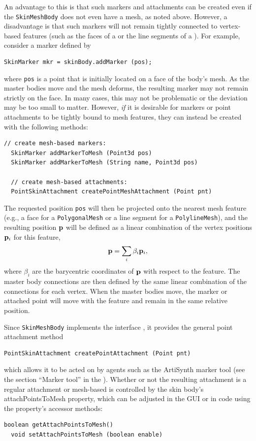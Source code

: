 An advantage to this is that such markers and attachments can be
created even if the {\tt SkinMeshBody} does not even have a mesh, as
noted above. However, a disadvantage is that such markers will not
remain tightly connected to vertex-based features (such as the faces
of a  or the line segments
of a ). For example,
consider a marker defined by
%
\begin{lstlisting}[]
  SkinMarker mkr = skinBody.addMarker (pos);
\end{lstlisting}
%
where {\tt pos} is a point that is initially located on a face of the
body's mesh. As the master bodies move and the mesh deforms, the
resulting marker may not remain strictly on the face. In many cases,
this may not be problematic or the deviation may be too small to
matter. However, {\it if} it is desirable for markers or point
attachments to be tightly bound to mesh features, they can instead be
created with the following methods:
%
\begin{lstlisting}[]
  // create mesh-based markers:
  SkinMarker addMarkerToMesh (Point3d pos)
  SkinMarker addMarkerToMesh (String name, Point3d pos)

  // create mesh-based attachments:
  PointSkinAttachment createPointMeshAttachment (Point pnt)
\end{lstlisting}
%
The requested position {\tt pos} will then be projected onto the
nearest mesh feature (e.g., a face for a {\tt PolygonalMesh} or a line
segment for a {\tt PolylineMesh}), and the resulting position ${\bf p}$
will be defined as a linear combination of the vertex positions
${\bf p}_i$ for this feature,
%
\begin{equation}
{\bf p} = \sum_i \beta_i {\bf p}_i,
\end{equation}
%
where $\beta_i$ are the barycentric coordinates of ${\bf p}$ with respect
to the feature. The master body connections are then defined by the
same linear combination of the connections for each vertex.  When the
master bodies move, the marker or attached point will move with the
feature and remain in the same relative position.

Since {\tt SkinMeshBody} implements the interface
, it
provides the general point attachment method
%
\begin{lstlisting}[]
  PointSkinAttachment createPointAttachment (Point pnt)
\end{lstlisting}
%
which allows it to be acted on by agents such as the ArtiSynth marker
tool (see the section ``Marker tool'' in the
).  Whether
or not the resulting attachment is a regular attachment or mesh-based
is controlled by the skin body's {\sf attachPointsToMesh} property,
which can be adjusted in the GUI or in code using the property's
accessor methods:
%
\begin{lstlisting}[]
  boolean getAttachPointsToMesh()
  void setAttachPointsToMesh (boolean enable)
\end{lstlisting}
%
